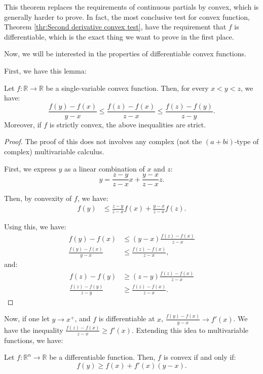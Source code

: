 This theorem replaces the requirements of continuous partials by convex, which
is generally harder to prove. In fact, the most conclusive test for convex
function, Theorem \ref{thr:Second derivative convex test}, have the requirement
that \( f \) is differentiable, which is the exact thing we want to prove in the
first place. 

Now, we will be interested in the properties of differentiable convex functions.

First, we have this lemma:

\begin{lemma}
\label{lem:Convex inequality for one variable}
  Let \( f: \mathbb{R} \to \mathbb{R} \) be a single-variable convex function.
  Then, for every \( x < y < z \), we have:
  \[
    \frac{f(y) - f(x)}{y - x} \le \frac{f(z) - f(x)}{z - x} \le \frac{f(z) -
    f(y)}{z - y}
  .\] Moreover, if \( f \) is strictly convex, the above inequalities are strict.
\end{lemma}

\begin{proof}
  The proof of this does not involves any complex (not the \( (a+bi) \)-type of
  complex) multivariable calculus.

  First, we express \( y \) as a linear combination of \( x \) and \( z \):
  \[
    y = \frac{z - y}{z - x}x + \frac{y - x}{z - x}z
  .\] 

  Then, by convexity of \( f \), we have:
  \begin{align*}
    f(y) &\le \frac{z - y}{z - x}f(x) + \frac{y - x}{z - x}f(z)
  .\end{align*}

  Using this, we have:
  \begin{align*}
    f(y) - f(x) &\le (y-x) \frac{f(z) - f(x)}{z - x}  \\
    \frac{f(y) - f(x)}{y - x} &\le \frac{f(z) - f(x)}{z - x}
  ,\end{align*} and:
  \begin{align*}
      f(z) - f(y) &\ge (z - y) \frac{f(z) - f(x)}{z - x}\\
    \frac{f(z)-f(y)}{z - y} &\ge \frac{f(z) - f(x)}{z - x}
  .\end{align*}
\end{proof}

Now, if one let \( y \to x^{+} \), and \( f \) is differentiable at \( x \), \(
\frac{f(y)-f(x)}{y - x} \to f'(x) \). We have the inequality \( \frac{f(z) -
f(x)}{z - x} \ge f'(x) \). Extending this idea to multivariable functions, we
have:
\begin{theorem}
\label{thr:Derivative inequality of convex function}
  Let \( f: \mathbb{R}^{n} \to \mathbb{R} \) be a differentiable
  function. Then, \( f \) is convex if and only if:
  \[
    f(y) \ge f(x) + f'(x)(y-x)
  .\] 
\end{theorem}

